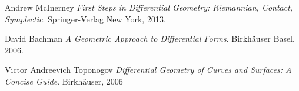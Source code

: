 \documentclass{article}
\begin{document}
\begin{thebibliography}{9}

{}
  
  Andrew McInerney
  \textit{First Steps in Differential Geometry: Riemannian, Contact, Symplectic}. 
  Springer-Verlag New York, 2013.

  David Bachman
  \textit{A Geometric Approach to Differential Forms}.
  Birkhäuser Basel, 2006.

  Victor Andreevich Toponogov
  \textit{Differential Geometry of Curves and Surfaces: A Concise Guide}. 
  Birkhäuser, 2006

\end{thebibliography}
\end{document}
